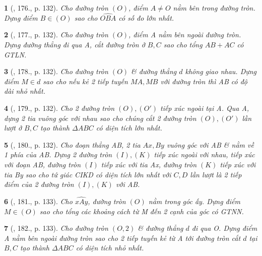 \documentclass{article}
\newtheorem{baitoan}{}
\begin{document}
\begin{baitoan}[\cite{Binh_Toan_9_tap_1}, 176., p. 132]
	Cho đường tròn $(O)$, điểm $A\ne O$ nằm bên trong đường tròn. Dựng điểm $B\in(O)$ sao cho $\widehat{OBA}$ có số đo lớn nhất.
\end{baitoan}

\begin{baitoan}[\cite{Binh_Toan_9_tap_1}, 177., p. 132]
	Cho đường tròn $(O)$, điểm A nằm bên ngoài đường tròn. Dựng đường thẳng đi qua A, cắt đường tròn ở $B,C$ sao cho tổng $AB + AC$ có {\rm GTLN}.
\end{baitoan}

\begin{baitoan}[\cite{Binh_Toan_9_tap_1}, 178., p. 132]
	Cho đường tròn $(O)$ \& đường thẳng $d$ không giao nhau. Dựng điểm $M\in d$ sao cho nếu  kẻ 2 tiếp tuyến $MA,MB$ với đường tròn thì AB có độ dài nhỏ nhất.
\end{baitoan}

\begin{baitoan}[\cite{Binh_Toan_9_tap_1}, 179., p. 132]
	Cho 2 đường tròn $(O),(O')$ tiếp xúc ngoài tại A. Qua A, dựng 2 tia vuông góc với nhau sao cho chúng cắt 2 đường tròn $(O),(O')$ lần lượt ở $B,C$ tạo thành $\Delta ABC$ có diện tích lớn nhất.
\end{baitoan}

\begin{baitoan}[\cite{Binh_Toan_9_tap_1}, 180., p. 132]
	Cho đoạn thẳng AB, 2 tia $Ax,By$ vuông góc với AB \& nằm về 1 phía của AB. Dựng 2 đường tròn $(I),(K)$ tiếp xúc ngoài với nhau, tiếp xúc với đoạn AB, đường tròn $(I)$ tiếp xúc với tia Ax, đường tròn $(K)$ tiếp xúc với tia By sao cho tứ giác CIKD có diện tích lớn nhất với $C,D$ lần lượt là 2 tiếp điểm của 2 đường tròn $(I),(K)$ với AB.
\end{baitoan}

\begin{baitoan}[\cite{Binh_Toan_9_tap_1}, 181., p. 133]
	Cho $\widehat{xAy}$, đường tròn $(O)$ nằm trong góc ấy. Dựng điểm $M\in(O)$ sao cho tổng các khoảng cách từ M đến 2 cạnh của góc có {\rm GTNN}.
\end{baitoan}

\begin{baitoan}[\cite{Binh_Toan_9_tap_1}, 182., p. 133]
	Cho đường tròn $(O,2)$ \& đường thẳng $d$ đi qua O. Dựng điểm A nằm bên ngoài đường tròn sao cho 2 tiếp tuyến kẻ từ A tới đường tròn cắt $d$ tại $B,C$ tạo thành $\Delta ABC$ có diện tích nhỏ nhất.
\end{baitoan}
\end{document}
